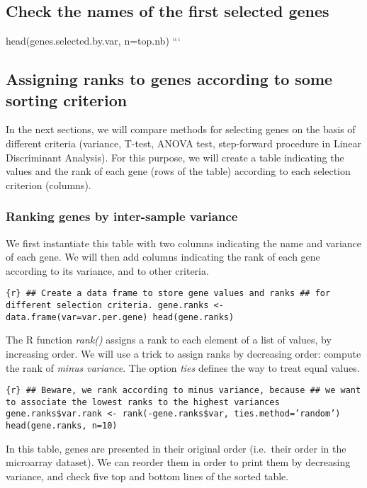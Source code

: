 \subsection{Check the names of the first selected
genes}\label{check-the-names-of-the-first-selected-genes}

head(genes.selected.by.var, n=top.nb) ```

\subsection{Assigning ranks to genes according to some sorting
criterion}\label{assigning-ranks-to-genes-according-to-some-sorting-criterion}

In the next sections, we will compare methods for selecting genes on the
basis of different criteria (variance, T-test, ANOVA test, step-forward
procedure in Linear Discriminant Analysis). For this purpose, we will
create a table indicating the values and the rank of each gene (rows of
the table) according to each selection criterion (columns).

\subsubsection{Ranking genes by inter-sample
variance}\label{ranking-genes-by-inter-sample-variance}

We first instantiate this table with two columns indicating the name and
variance of each gene. We will then add columns indicating the rank of
each gene according to its variance, and to other criteria.

\texttt{\{r\} \#\# Create a data frame to store gene values and ranks  \#\# for different selection criteria. gene.ranks \textless{}- data.frame(var=var.per.gene) head(gene.ranks)}

The R function \emph{rank()} assigns a rank to each element of a list of
values, by increasing order. We will use a trick to assign ranks by
decreasing order: compute the rank of \emph{minus variance}. The option
\emph{ties} defines the way to treat equal values.

\texttt{\{r\} \#\# Beware, we rank according to minus variance, because  \#\# we want to associate the lowest ranks to the highest variances gene.ranks\$var.rank \textless{}- rank(-gene.ranks\$var, ties.method='random') head(gene.ranks, n=10)}

In this table, genes are presented in their original order (i.e.~their
order in the microarray dataset). We can reorder them in order to print
them by decreasing variance, and check five top and bottom lines of the
sorted table.

